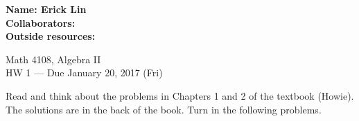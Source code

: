 \documentclass[12pt]{article}
\begin{document}
\noindent
\textbf{Name: Erick Lin} \smallskip  \\
\textbf{Collaborators:} \smallskip \\ %
\textbf{Outside resources:} %

\begin{center}
{
Math 4108, Algebra II \\
HW 1 --- Due January 20, 2017 (Fri)
}
\end{center}

\noindent Read and think about the problems in Chapters 1 and 2 of the textbook (Howie).  The solutions are in the back of the book.  Turn in the following problems.
\end{document}

